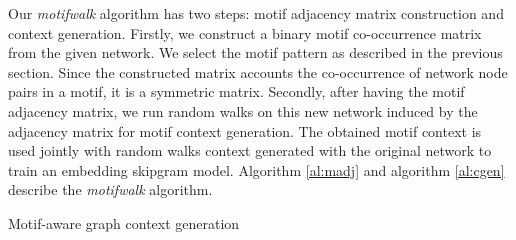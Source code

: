 \documentclass{article}
\theoremstyle{definition}
\begin{document}
Our \emph{motifwalk} algorithm has two steps: motif adjacency matrix
construction and context generation. Firstly, we construct a binary
motif co-occurrence matrix from the given network. We select the motif
pattern as described in the previous section. Since the constructed matrix 
accounts the co-occurrence of network node pairs in a motif, it is a 
symmetric matrix. Secondly, after having the motif adjacency matrix, 
we run random walks on this new network induced by the adjacency matrix
for motif context generation. The obtained motif context is used jointly 
with random walks context generated with the original network to train an 
embedding skipgram model. Algorithm \ref{al:madj} and algorithm 
\ref{al:cgen} describe the \emph{motifwalk} algorithm.
\begin{algorithm}[h] \label{al:cgen}
\caption{Motif-aware graph context generation}
\end{algorithm}
\end{document}
